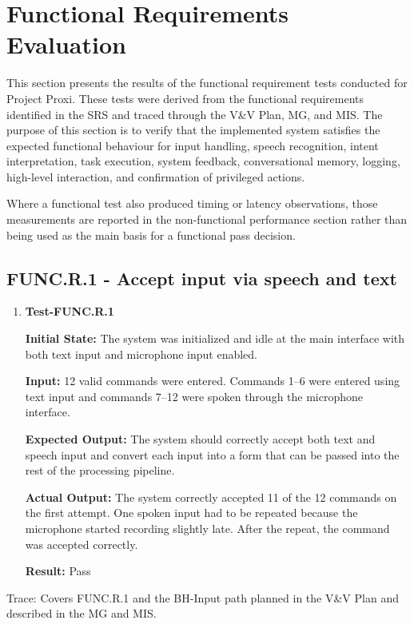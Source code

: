 \documentclass[12pt]{article}
\begin{document}
\section{Functional Requirements Evaluation}

\noindent This section presents the results of the functional requirement tests
conducted for Project Proxi. These tests were derived from the
functional requirements identified in the SRS and traced through the
V\&V Plan, MG, and MIS. The purpose of this section is to verify that
the implemented system satisfies the expected functional behaviour for
input handling, speech recognition, intent interpretation, task
execution, system feedback, conversational memory, logging, high-level
interaction, and confirmation of privileged actions.

Where a functional test also produced timing or latency observations, those
measurements are reported in the non-functional performance section rather
than being used as the main basis for a functional pass decision.

\subsection{FUNC.R.1 - Accept input via speech and text}

\begin{enumerate}
    \item \textbf{Test-FUNC.R.1}
    
    \textbf{Initial State:} The system was initialized and idle at the
    main interface with both text input and microphone input enabled.
    
    \textbf{Input:} 12 valid commands were entered. Commands 1--6 were
    entered using text input and commands 7--12 were spoken through the
    microphone interface.
    
    \textbf{Expected Output:} The system should correctly accept both
    text and speech input and convert each input into a form that can
    be passed into the rest of the processing pipeline.
    
    \textbf{Actual Output:} The system correctly accepted 11 of the 12
    commands on the first attempt. One spoken input had to be repeated
    because the microphone started recording slightly late. After the
    repeat, the command was accepted correctly.
    
    \textbf{Result:} Pass
\end{enumerate}

\noindent Trace: Covers FUNC.R.1 and the BH-Input path planned in the V\&V Plan
and described in the MG and MIS.
\end{document}
